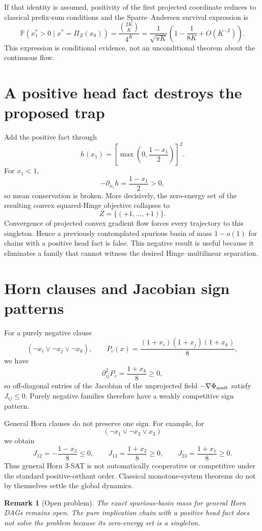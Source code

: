 \documentclass[11pt,a4paper]{article}
\newtheorem{remark}[theorem]{Remark}
\begin{document}
If that identity is assumed, positivity of the first projected coordinate reduces to classical prefix-sum conditions and the Sparre--Andersen survival expression is
\begin{equation}
\mathbb P(x_1^*>0\mid x^*=\Pi_Z(x_0))=\frac{\binom{2K}{K}}{4^K}=\frac1{\sqrt{\pi K}}\left(1-\frac1{8K}+O(K^{-2})\right).
\end{equation}
This expression is conditional evidence, not an unconditional theorem about the continuous flow.

\section{A positive head fact destroys the proposed trap}
Add the positive fact through
\[
h(x_1)=\left[\max\left(0,\frac{1-x_1}{2}\right)\right]^2.
\]
For $x_1<1$,
\[
-\partial_{x_1}h=\frac{1-x_1}{2}>0,
\]
so mean conservation is broken. More decisively, the zero-energy set of the resulting convex squared-Hinge objective collapses to
\[
Z=\{(+1,\ldots,+1)\}.
\]
Convergence of projected convex gradient flow forces every trajectory to this singleton. Hence a previously contemplated spurious basin of mass $1-o(1)$ for chains with a positive head fact is false. This negative result is useful because it eliminates a family that cannot witness the desired Hinge--multilinear separation.

\section{Horn clauses and Jacobian sign patterns}
For a purely negative clause
\[
(\neg x_i\lor\neg x_j\lor\neg x_k),\qquad P_c(x)=\frac{(1+x_i)(1+x_j)(1+x_k)}8,
\]
we have
\[
\partial_{ij}^2P_c=\frac{1+x_k}{8}\ge0,
\]
so off-diagonal entries of the Jacobian of the unprojected field $-\nabla\Phi_{\rm mult}$ satisfy $J_{ij}\le0$. Purely negative families therefore have a weakly competitive sign pattern.

General Horn clauses do not preserve one sign. For example, for
\[
(\neg x_1\lor\neg x_2\lor x_3)
\]
we obtain
\[
J_{12}=-\frac{1-x_3}{8}\le0,\qquad J_{13}=\frac{1+x_2}{8}\ge0,\qquad J_{23}=\frac{1+x_1}{8}\ge0.
\]
Thus general Horn 3-SAT is not automatically cooperative or competitive under the standard positive-orthant order. Classical monotone-system theorems do not by themselves settle the global dynamics.

\begin{remark}[Open problem]
The exact spurious-basin mass for general Horn DAGs remains open. The pure implication chain with a positive head fact does not solve the problem because its zero-energy set is a singleton.
\end{remark}
\end{document}
